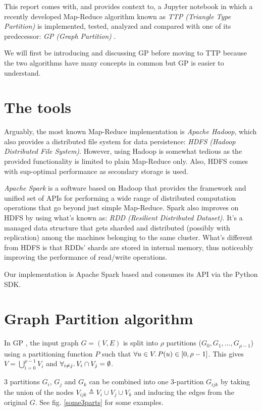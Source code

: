 \documentclass[paper=a4, fontsize=11pt]{scrartcl}
\begin{document}
This report comes with, and provides context to, a Jupyter notebook in which a
recently developed Map-Reduce algorithm known as \emph{TTP (Triangle Type
Partition)} \cite{park2013efficient} is implemented, tested, analyzed and
compared with one of its predecessor: \emph{GP (Graph Partition)}
\cite{suri2011counting}.

We will first be introducing and discussing GP before moving to TTP because the
two algorithms have many concepts in common but GP is easier to understand.

\section{The tools}
Arguably, the most known Map-Reduce implementation is \emph{Apache Hadoop},
which also provides a distributed file system for data persistence: \emph{HDFS
(Hadoop Distributed File System)}. However, using Hadoop is somewhat tedious as
the provided functionality is limited to plain Map-Reduce only. Also, HDFS comes
with sup-optimal performance as secondary storage is used.

\emph{Apache Spark} is a software based on Hadoop that provides the framework
and unified set of APIs for performing a wide range of distributed computation
operations that go beyond just simple Map-Reduce. Spark also improves on HDFS by
using what's known as: \emph{RDD (Resilient Distributed Dataset)}. It's a
managed data structure that gets sharded and distributed (possibly with
replication) among the machines belonging to the same cluster. What's different
from HDFS is that RDDs' shards are stored in internal memory, thus noticeably
improving the performance of read/write operations.

Our implementation is Apache Spark based and consumes its API via the Python
SDK.

\section{Graph Partition algorithm}
In GP \cite{suri2011counting}, the input graph $G=(V, E)$ is split into $\rho$
partitions ($G_0, G_1, \dots, G_{\rho-1}$) using a partitioning function $P$
such that $\forall u \in V \ldotp P(u) \in [0, \rho-1]$. This gives
$V=\bigcup_{i=0}^{\rho-1} V_i$ and $\forall_{i\neq j} \ldotp V_i \cap V_j =
\emptyset$.

3 partitions $G_i$, $G_j$ and $G_k$ can be combined into one 3-partition
$G_{ijk}$ by taking the union of the nodes $V_{ijk} \triangleq V_i \cup V_j \cup
V_k$ and inducing the edges from the original $G$. See fig. \ref{some3parts} for
some examples.
\end{document}
